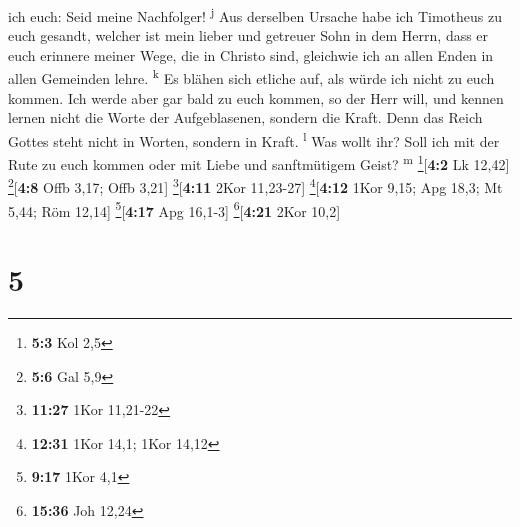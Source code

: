 ich euch: Seid meine Nachfolger! \textsuperscript{j}  Aus
derselben Ursache habe ich Timotheus zu euch gesandt, welcher ist mein
lieber und getreuer Sohn in dem Herrn, dass er euch erinnere meiner
Wege, die in Christo sind, gleichwie ich an allen Enden in allen
Gemeinden lehre. \textsuperscript{k}  Es blähen sich
etliche auf, als würde ich nicht zu euch kommen.  Ich
werde aber gar bald zu euch kommen, so der Herr will, und kennen lernen
nicht die Worte der Aufgeblasenen, sondern die Kraft. 
Denn das Reich Gottes steht nicht in Worten, sondern in Kraft.
\textsuperscript{l}  Was wollt ihr? Soll ich mit der Rute
zu euch kommen oder mit Liebe und sanftmütigem Geist?
\textsuperscript{m} \footnote{\textbf{5:3} Kol 2,5}{[}\textbf{4:2} Lk
12,42{]} \footnote{\textbf{5:6} Gal 5,9}{[}\textbf{4:8} Offb 3,17; Offb
3,21{]} \footnote{\textbf{11:27} 1Kor 11,21-22}{[}\textbf{4:11} 2Kor
11,23-27{]} \footnote{\textbf{12:31} 1Kor 14,1; 1Kor 14,12}{[}\textbf{4:12}
1Kor 9,15; Apg 18,3; Mt 5,44; Röm 12,14{]} \footnote{\textbf{9:17} 1Kor
  4,1}{[}\textbf{4:17} Apg 16,1-3{]} \footnote{\textbf{15:36} Joh 12,24}{[}\textbf{4:21}
2Kor 10,2{]}

\hypertarget{section-4}{%
\section{5}\label{section-4}}


